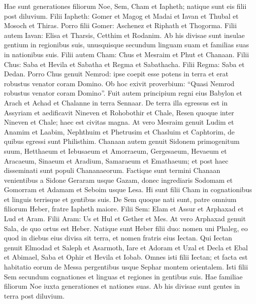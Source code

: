 \begin{biblechapter}  
\verse Hae sunt generationes filiorum Noe, Sem, Cham et Iapheth; natique sunt eis filii post diluvium.
\verse Filii Iapheth: Gomer et Magog et Madai et Iavan et Thubal et Mosoch et Thiras. 
\verse Porro filii Gomer: Aschenez et Riphath et Thogorma. 
\verse Filii autem Iavan: Elisa et Tharsis, Cetthim et Rodanim. 
\verse Ab his divisae sunt insulae gentium in regionibus suis, unusquisque secundum linguam suam et familias suas in nationibus suis. 
\verse Filii autem Cham: Chus et Mesraim et Phut et Chanaan. 
\verse Filii Chus: Saba et Hevila et Sabatha et Regma et Sabathacha. Filii Regma: Saba et Dedan. 
\verse Porro Chus genuit Nemrod: ipse coepit esse potens in terra 
\verse et erat robustus venator coram Domino. Ob hoc exivit proverbium: “Quasi Nemrod robustus venator coram Domino”. 
\verse Fuit autem principium regni eius Babylon et Arach et Achad et Chalanne in terra Sennaar. 
\verse De terra illa egressus est in Assyriam et aedificavit Nineven et Rohobothir et Chale, 
\verse Resen quoque inter Nineven et Chale; haec est civitas magna. 
\verse At vero Mesraim genuit Ludim et Anamim et Laabim, Nephthuim 
\verse et Phetrusim et Chasluim et Caphtorim, de quibus egressi sunt Philisthim. 
\verse Chanaan autem genuit Sidonem primogenitum suum, Hetthaeum 
\verse et Iebusaeum et Amorraeum, Gergesaeum, 
\verse Hevaeum et Aracaeum, Sinaeum 
\verse et Aradium, Samaraeum et Emathaeum; et post haec disseminati sunt populi Chananaeorum. 
\verse Factique sunt termini Chanaan venientibus a Sidone Geraram usque Gazam, donec ingrediaris Sodomam et Gomorram et Adamam et Seboim usque Lesa. 
\verse Hi sunt filii Cham in cognationibus et linguis terrisque et gentibus suis. 
\verse De Sem quoque nati sunt, patre omnium filiorum Heber, fratre Iapheth maiore.  
\verse Filii Sem: Elam et Assur et Arphaxad et Lud et Aram. 
\verse Filii Aram: Us et Hul et Gether et Mes. 
\verse At vero Arphaxad genuit Sala, de quo ortus est Heber. 
\verse Natique sunt Heber filii duo: nomen uni Phaleg, eo quod in diebus eius divisa sit terra, et nomen fratris eius Iectan. 
\verse Qui Iectan genuit Elmodad et Saleph et Asarmoth, Iare 
\verse et Adoram et Uzal et Decla 
\verse et Ebal et Abimael, Saba 
\verse et Ophir et Hevila et Iobab. Omnes isti filii Iectan; 
\verse et facta est habitatio eorum de Messa pergentibus usque Sephar montem orientalem. 
\verse Isti filii Sem secundum cognationes et linguas et regiones in gentibus suis. 
\verse Hae familiae filiorum Noe iuxta generationes et nationes suas. Ab his divisae sunt gentes in terra post diluvium. 
\end{biblechapter}


